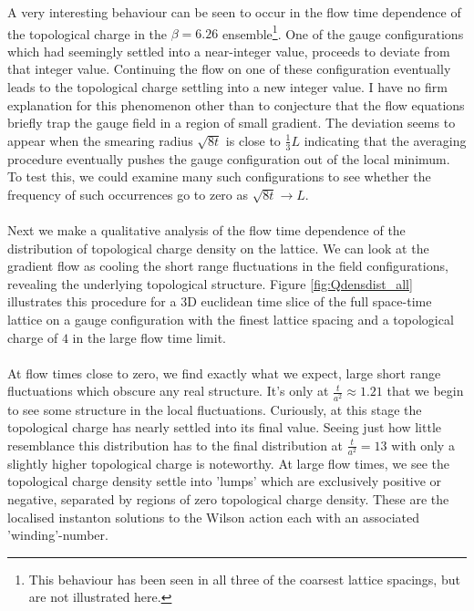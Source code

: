 \documentclass[a4paper,10pt]{book}
\begin{document}
A very interesting behaviour can be seen to occur in the flow time dependence of the topological charge in the $\beta = 6.26$ ensemble\footnote{This behaviour has been seen in all three of the coarsest lattice spacings, but are not illustrated here.}. One of the gauge configurations which had seemingly settled into a near-integer value, proceeds to deviate from that integer value. Continuing the flow on one of these configuration eventually leads to the topological charge settling into a new integer value. I have no firm explanation for this phenomenon other than to conjecture that the flow equations briefly trap the gauge field in a region of small gradient. The deviation seems to appear when the smearing radius $\sqrt{8t}$ is close to $\frac{1}{3}L$ indicating that the averaging procedure eventually pushes the gauge configuration out of the local minimum. To test this, we could examine many such configurations to see whether the frequency of such occurrences go to zero as $\sqrt{8t}\rightarrow L$.\\\\Next we make a qualitative analysis of the flow time dependence of the distribution of topological charge density on the lattice. We can look at the gradient flow as cooling the short range fluctuations in the field configurations, revealing the underlying topological structure.
Figure \ref{fig:Qdensdist_all} illustrates this procedure for a 3D euclidean time slice of the full space-time lattice on a gauge configuration with the finest lattice spacing and a topological charge of $4$ in the large flow time limit.\\\\At flow times close to zero, we find exactly what we expect, large short range fluctuations which obscure any real structure. It's only at $\frac{t}{a^2}\approx 1.21$ that we begin to see some structure in the local fluctuations. Curiously, at this stage the topological charge has nearly settled into its final value. Seeing just how little resemblance this distribution has to the final distribution at $\frac{t}{a^2}=13$ with only a slightly higher topological charge is noteworthy. At large flow times, we see the topological charge density settle into 'lumps' which are exclusively positive or negative, separated by regions of zero topological charge density. These are the localised instanton solutions to the Wilson action each with an associated 'winding'-number.
\end{document}
